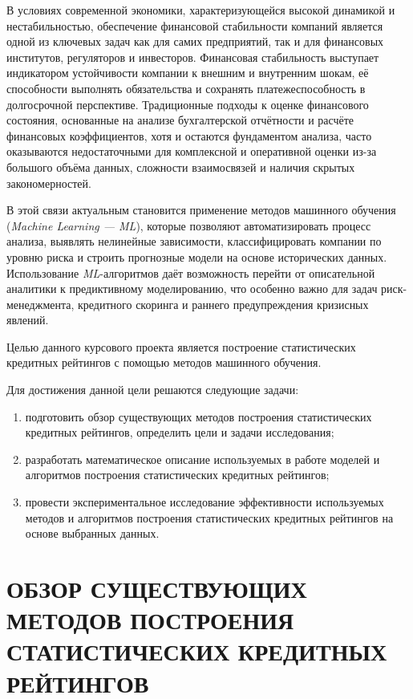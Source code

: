 \documentclass[14pt,a4paper]{extarticle}
\begin{document}
В условиях современной экономики, характеризующейся высокой динамикой 
и нестабильностью, обеспечение финансовой стабильности компаний 
является одной из ключевых задач как для самих предприятий, 
так и для финансовых институтов, регуляторов и инвесторов. 
Финансовая стабильность выступает индикатором устойчивости компании 
к внешним и внутренним шокам, её способности выполнять обязательства 
и сохранять платежеспособность в долгосрочной перспективе. Традиционные 
подходы к оценке финансового состояния, основанные на анализе 
бухгалтерской отчётности и расчёте финансовых коэффициентов, хотя и 
остаются фундаментом анализа, часто оказываются недостаточными для 
комплексной и оперативной оценки из-за большого объёма данных, 
сложности взаимосвязей и наличия скрытых закономерностей.

В этой связи актуальным становится применение методов машинного 
обучения (\textit{Machine Learning --- ML}), которые позволяют 
автоматизировать процесс анализа, выявлять нелинейные зависимости, 
классифицировать компании по уровню риска и строить прогнозные модели 
на основе исторических данных. Использование \textit{ML}-алгоритмов 
даёт возможность перейти от описательной аналитики к предиктивному 
моделированию, что особенно важно для задач риск-менеджмента, 
кредитного скоринга и раннего предупреждения кризисных явлений.

Целью данного курсового проекта является построение статистических 
кредитных рейтингов с помощью методов машинного обучения.

Для достижения данной цели решаются следующие задачи:
\begin{enumerate}
    \item подготовить обзор существующих методов построения статистических кредитных рейтингов, 
    определить цели и задачи исследования;
    \item разработать математическое описание используемых в работе моделей и алгоритмов построения 
    статистических кредитных рейтингов;
    \item провести экспериментальное исследование эффективности используемых методов и алгоритмов 
    построения статистических кредитных рейтингов на основе выбранных данных.
\end{enumerate}

\clearpage

\section{ОБЗОР СУЩЕСТВУЮЩИХ МЕТОДОВ ПОСТРОЕНИЯ СТАТИСТИЧЕСКИХ КРЕДИТНЫХ РЕЙТИНГОВ}
\end{document}
